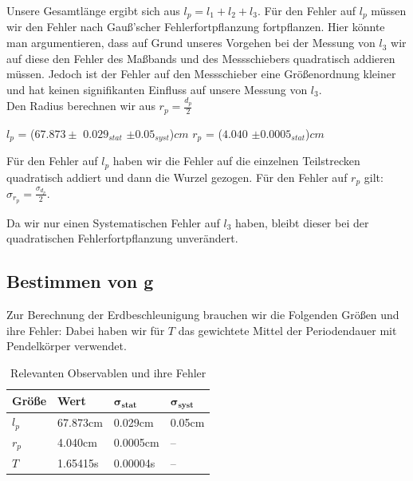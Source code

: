 \documentclass[twoside]{protokoll}
\begin{document}
Unsere Gesamtlänge ergibt sich aus $l_p = l_1 + l_2 + l_3$. Für den Fehler auf $l_p$ müssen wir den Fehler nach Gauß'scher Fehlerfortpflanzung fortpflanzen. 
Hier könnte man argumentieren, dass auf Grund unseres Vorgehen bei der Messung von $l_3$ wir auf diese den Fehler des Maßbands und des Messschiebers quadratisch addieren müssen.
Jedoch ist der Fehler auf den Messschieber eine Größenordnung kleiner und hat keinen signifikanten Einfluss auf unsere Messung von $l_3$.\\
Den Radius berechnen wir aus $r_p = \frac{d_p}{2}$
\begin{center}
$l_p$ = ($67.873 \pm$ $0.029_{stat}$ $\pm 0.05_{syst}$)$cm$   \qquad $r_p$ = ($4.040$ $\pm 0.0005_{stat}$)$cm$
\end{center}

Für den Fehler auf $l_p$ haben wir die Fehler auf die einzelnen Teilstrecken quadratisch addiert und dann die Wurzel gezogen.
Für den Fehler auf $r_p$  gilt: $\sigma_{r_p} =\frac{\sigma_{d_p}}{2}$.

Da wir nur einen Systematischen Fehler auf $l_3$ haben, bleibt dieser bei der quadratischen Fehlerfortpflanzung unverändert.

\subsection{Bestimmen von g}

Zur Berechnung der Erdbeschleunigung brauchen wir die Folgenden Größen und ihre Fehler:
Dabei haben wir für $T$ das gewichtete Mittel der Periodendauer mit Pendelkörper verwendet.
 
\begin{table}[H]
        \centering
        \begin{tabularx}{1.0\textwidth}{X X X X} %
            \toprule
            \textbf{Größe} & \textbf{Wert} & $\mathbf{\sigma_{stat}}$ & $\mathbf{\sigma_{syst}}$ \\
            \midrule
            $l_p$ & 67.873cm & 0.029cm & 0.05cm \\
            $r_p$ & 4.040cm & 0.0005cm & --\\
            $T$ & 1.65415s & 0.00004s & --\\
            \bottomrule
        \end{tabularx}
        \caption{Relevanten Observablen und ihre Fehler}
        \label{tab:längen un fehler}
    \end{table}
    
\end{document}

